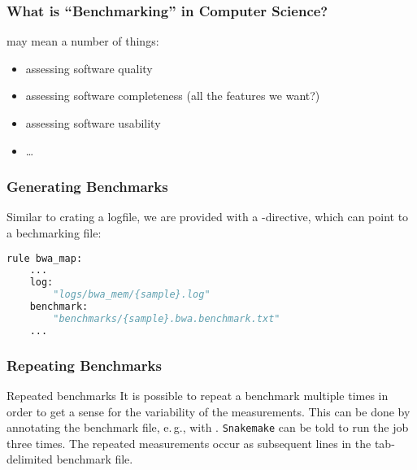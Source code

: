 \begin{frame}
  \frametitle{What is ``Benchmarking'' in Computer Science?}
   may mean a number of things:
  \begin{itemize}[<+->]
   \item assessing software quality
   \item assessing software completeness (all the features we want?)
   \item assessing software usability
   \item \ldots
  \end{itemize}
\end{frame}

\begin{frame}[fragile]
  \frametitle{Generating Benchmarks}
  Similar to crating a logfile, we are provided with a -directive, which can point to a bechmarking file:
  \begin{lstlisting}[language=Python,style=Python]
rule bwa_map:
    ...
    log:
        "logs/bwa_mem/{sample}.log"
    benchmark:
        "benchmarks/{sample}.bwa.benchmark.txt"
    ...
  \end{lstlisting} 
\end{frame}

\begin{frame}[fragile]
  \frametitle{Repeating Benchmarks}
  \vfill
  \begin{exampleblock}{Repeated benchmarks}
   It is possible to repeat a benchmark multiple times in order to get a sense for the variability of the measurements. This can be done by annotating the benchmark file, e.\,g., with . \texttt{Snakemake} can be told to run the job three times. The repeated measurements occur as subsequent lines in the tab-delimited benchmark file.
  \end{exampleblock}
  \vfill
\end{frame} 

